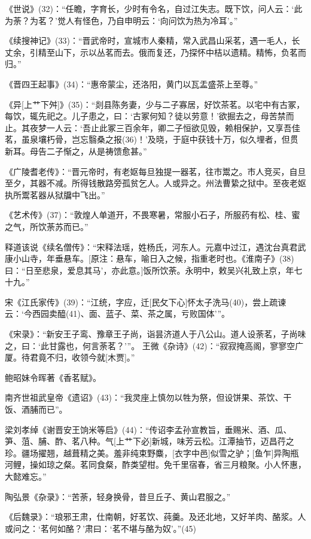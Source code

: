 \documentclass[12pt,UTF8]{ctexbook}
\begin{document}
《世说》(32)：“任瞻，字育长，少时有令名，自过江失志。既下饮，问人云：‘此为荼？为茗？’觉人有怪色，乃自申明云：‘向问饮为热为冷耳’。”

《续搜神记》(33)：“晋武帝时，宣城市人秦精，常入武昌山采茗，遇一毛人，长丈余，引精至山下，示以丛茗而去。俄而复还，乃探怀中桔以遗精。精怖，负茗而归。”

《晋四王起事》(34)：“惠帝蒙尘，还洛阳，黄门以瓦盂盛茶上至尊。”

《异[上艹下舛]》(35)：“剡县陈务妻，少与二子寡居，好饮茶茗。以宅中有古冢，每饮，辄先祀之。儿子患之，曰：‘古冢何知？徒以劳意！’欲掘去之，母苦禁而止。其夜梦一人云：‘吾止此冢三百余年，卿二子恒欲见毁，赖相保护，又享吾佳茗，虽泉壤朽骨，岂忘翳桑之报(36)！’及晓，于庭中获钱十万，似久埋者，但贯新耳。母告二子惭之，从是祷馈愈甚。”

《广陵耆老传》：“晋元帝时，有老妪每旦独提一器茗，往市鬻之。市人竞买，自旦至夕，其器不减。所得钱散路旁孤贫乞人。人或异之。州法曹絷之狱中。至夜老妪执所鬻茗器从狱牖中飞出。”

《艺术传》(37)：“敦煌人单道开，不畏寒暑，常服小石子，所服药有松、桂、蜜之气，所饮荼苏而已。”

释道该说《续名僧传》：“宋释法瑶，姓杨氏，河东人。元嘉中过江，遇沈台真君武康小山寺，年垂悬车。[原注：悬车，喻日入之候，指重老时也。《淮南子》(38)曰：“日至悲泉，爱息其马’，亦此意。]饭所饮荼。永明中，敕吴兴礼致上京，年七十九。”

宋《江氏家传》(39)：“江统，字应，迁[民攵下心]怀太子洗马(40)，尝上疏谏云：‘今西园卖醯(41)、面、蓝子、菜、茶之属，亏败国体’”。

《宋录》：“新安王子鸾、豫章王子尚，诣昙济道人于八公山。道人设荼茗，子尚味之，曰：‘此甘露也，何言荼茗？’”。
王微《杂诗》(42)：“寂寂掩高阁，寥寥空广厦。待君竟不归，收领今就[木贾]。” 

鲍昭妹令晖著《香茗赋》。 

南齐世祖武皇帝《遗诏》(43)：“我灵座上慎勿以牲为祭，但设饼果、茶饮、干饭、酒脯而已”。

梁刘孝绰《谢晋安王饷米等启》(44)：“传诏李孟孙宣教旨，垂赐米、酒、瓜、笋、菹、脯、酢、茗八种。气[上艹下必]新城，味芳云松。江潭抽节，迈昌荇之珍。疆场擢翘，越葺精之美。羞非纯束野麋，[衣字中邑]似雪之驴；[鱼乍]异陶瓶河鲤，操如琼之粲。茗同食粲，酢类望柑。免千里宿春，省三月粮聚。小人怀惠，大懿难忘。”

陶弘景《杂录》：“苦荼，轻身换骨，昔旦丘子、黄山君服之。”

《后魏录》：“琅邪王肃，仕南朝，好茗饮、莼羹。及还北地，又好羊肉、酪浆。人或问之：‘茗何如酪？’肃曰：‘茗不堪与酪为奴’。”(45)
\end{document}
